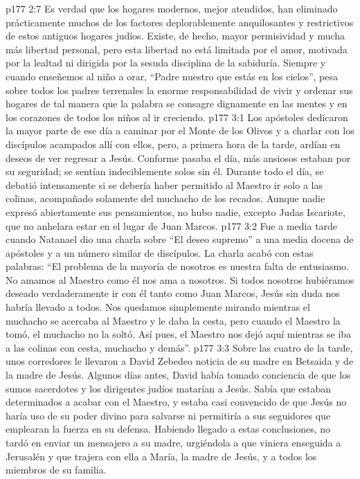 \vs p177 2:7 Es verdad que los hogares modernos, mejor atendidos, han eliminado prácticamente muchos de los factores deplorablemente anquilosantes y restrictivos de estos antiguos hogares judíos. Existe, de hecho, mayor permisividad y mucha más libertad personal, pero esta libertad no está limitada por el amor, motivada por la lealtad ni dirigida por la sesuda disciplina de la sabiduría. Siempre y cuando enseñemos al niño a orar, “Padre nuestro que estás en los cielos”, pesa sobre todos los padres terrenales la enorme responsabilidad de vivir y ordenar sus hogares de tal manera que la palabra  se consagre dignamente en las mentes y en los corazones de todos los niños al ir creciendo.
\vs p177 3:1 Los apóstoles dedicaron la mayor parte de ese día a caminar por el Monte de los Olivos y a charlar con los discípulos acampados allí con ellos, pero, a primera hora de la tarde, ardían en deseos de ver regresar a Jesús. Conforme pasaba el día, más ansiosos estaban por su seguridad; se sentían indeciblemente solos sin él. Durante todo el día, se debatió intensamente si se debería haber permitido al Maestro ir solo a las colinas, acompañado solamente del muchacho de los recados. Aunque nadie expresó abiertamente sus pensamientos, no hubo nadie, excepto Judas Iscariote, que no anhelara estar en el lugar de Juan Marcos.
\vs p177 3:2 \pc Fue a media tarde cuando Natanael dio una charla sobre “El deseo supremo” a una media docena de apóstoles y a un número similar de discípulos. La charla acabó con estas palabras: “El problema de la mayoría de nosotros es nuestra falta de entusiasmo. No amamos al Maestro como él nos ama a nosotros. Si todos nosotros hubiéramos deseado verdaderamente ir con él tanto como Juan Marcos, Jesús sin duda nos habría llevado a todos. Nos quedamos simplemente mirando mientras el muchacho se acercaba al Maestro y le daba la cesta, pero cuando el Maestro la tomó, el muchacho no la soltó. Así pues, el Maestro nos dejó aquí mientras se iba a las colinas con cesta, muchacho y demás”.
\vs p177 3:3 \pc Sobre las cuatro de la tarde, unos corredores le llevaron a David Zebedeo noticia de su madre en Betsaida y de la madre de Jesús. Algunos días antes, David había tomado conciencia de que los sumos sacerdotes y los dirigentes judíos matarían a Jesús. Sabía que estaban determinados a acabar con el Maestro, y estaba casi convencido de que Jesús no haría uso de su poder divino para salvarse ni permitiría a sus seguidores que emplearan la fuerza en su defensa. Habiendo llegado a estas conclusiones, no tardó en enviar un mensajero a su madre, urgiéndola a que viniera enseguida a Jerusalén y que trajera con ella a María, la madre de Jesús, y a todos los miembros de su familia.

